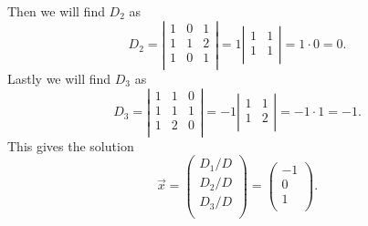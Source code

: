 Then we will find $D_2$ as
\[ 
D_2 = \left| \begin{array}{ccc}
1 & 0 & 1\\
1 & 1 & 2\\
1 & 0 & 1\\
\end{array} \right| = 1 \left| \begin{array}{cc}
1 & 1\\
1 & 1\\
\end{array} \right| = 1 \cdot 0 = 0
.\]
Lastly we will find $D_3$ as
\[ 
D_3 = \left| \begin{array}{ccc}
1 & 1 & 0\\
1 & 1 & 1\\
1 & 2 & 0\\
\end{array} \right| = -1 \left| \begin{array}{cc}
1 & 1\\
1 & 2\\
\end{array} \right| = -1 \cdot 1 = -1
.\]
This gives the solution
\[ 
\Vec{x} = \begin{pmatrix}
D_1 / D\\
D_2 / D\\
D_3 / D\\
\end{pmatrix} = \begin{pmatrix}
-1\\
0\\
1\\
\end{pmatrix}
.\]



